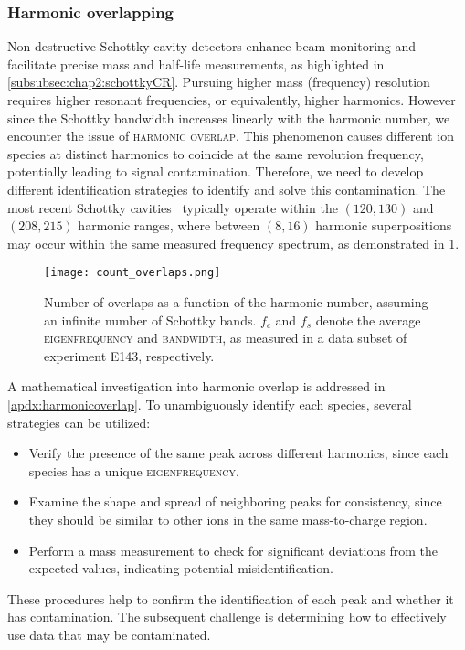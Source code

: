 \subsubsection{Harmonic overlapping}\label{subsubsec:chap2:harmonicoverlapping}
Non-destructive Schottky cavity detectors enhance beam monitoring and facilitate precise mass and half-life measurements, as highlighted in \cref{subsubsec:chap2:schottkyCR}.
Pursuing higher mass (frequency) resolution requires higher resonant frequencies, or equivalently, higher harmonics. However since the Schottky bandwidth increases linearly with the harmonic number, we encounter the issue of \textsc{harmonic overlap}. This phenomenon causes different ion species at distinct harmonics to coincide at the same revolution frequency, potentially leading to signal contamination. Therefore, we need to develop different identification strategies to identify and solve this contamination.
The most recent Schottky cavities~\cite{Sanjari_2013,Sanjari-410} typically operate within the $(120,130)$ and $(208,215)$ harmonic ranges, where between $(8,16)$ harmonic superpositions may occur within the same measured frequency spectrum, as demonstrated in \cref{fig:chap2:overlaps}.
\begin{figure}[hbt]
    \centering
    \texttt{[image: count\_overlaps.png]}
    \caption{%
        Number of overlaps as a function of the harmonic number, assuming an infinite number of Schottky bands. $f_c$ and $f_s$ denote the average \textsc{eigenfrequency} and \textsc{bandwidth}, as measured in a data subset of experiment \textsc{E143}, respectively.
    }\label{fig:chap2:overlaps}
\end{figure}
A mathematical investigation into harmonic overlap is addressed in \cref{apdx:harmonicoverlap}.
\newpar
To unambiguously identify each species, several strategies can be utilized:
\begin{itemize}
    \item Verify the presence of the same peak across different harmonics, since each species has a unique \textsc{eigenfrequency}.
    \item Examine the shape and spread of neighboring peaks for consistency, since they should be similar to other ions in the same mass-to-charge region.
    \item Perform a mass measurement to check for significant deviations from the expected values, indicating potential misidentification.
\end{itemize}
These procedures help to confirm the identification of each peak and whether it has contamination. The subsequent challenge is determining how to effectively use data that may be contaminated.
